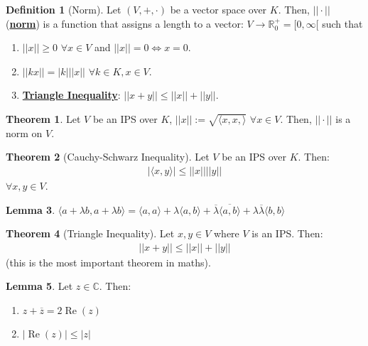 \documentclass[11pt]{scrartcl}
\newcommand{\R}[0]{\mathbb{R}}
\theoremstyle{definition}
\newtheorem{theorem}{Theorem}
\newtheorem{lemma}[theorem]{Lemma}
\newtheorem{definition}{Definition}
\theoremstyle{remark}
\newcommand{\dfn}[1]{\textbf{\underline{#1}}}
\newcommand{\C}[0]{\mathbb{C}}
\newcommand{\vsok}[0]{Let $(V, +, \cdot)$ be a vector space over $K$}
\begin{document}
\begin{definition}[Norm]
	\vsok. Then, $|| \cdot ||$ (\dfn{norm}) is a function that assigns a length to a vector: $V \rightarrow \R_0^+ = [0, \infty[$ such that
	\begin{enumerate}[noitemsep]
		\item $|| x|| \geq 0$ $\forall x \in V$ and $|| x || = 0 \iff x =0$. 
		\item $|| kx || = |k| || x ||  $ $\forall k \in K, x \in V$. 
		\item \dfn{Triangle Inequality}: $|| x +y || \leq || x || + ||y ||$. 
	\end{enumerate}
\end{definition}

\begin{theorem}
	Let $V$ be an IPS over $K$, $|| x || := \sqrt{ \langle x, x, \rangle }$ $\forall x \in V$. Then, $|| \cdot ||$ is a norm on $V$. 
\end{theorem}

\begin{theorem}[Cauchy-Schwarz Inequality]
	Let $V$ be an IPS over $K$. Then: 
	\begin{align}
		| \langle x, y \rangle | \leq || x|| || y || 	
	\end{align}
	$\forall x, y \in V$. 
\end{theorem}

\begin{lemma}
	$\langle a + \lambda b, a + \lambda b \rangle = \langle a, a \rangle + \lambda \langle a, b \rangle + \overline{\lambda} \overline{ \langle a, b \rangle } + \lambda \overline{\lambda} \langle b, b \rangle $
\end{lemma}


\begin{theorem}[Triangle Inequality]
	Let $x, y \in V$ where $V$ is an IPS. Then: 
	\begin{align}
		|| x + y || \leq || x|| + ||y||	
	\end{align}
	(this is the most important theorem in maths). 
\end{theorem}

\begin{lemma}
	Let $z \in \C$. Then: 
	\begin{enumerate}[noitemsep]
		\item $z + \overline{z} = 2 \operatorname{Re}(z)$
		\item $| \operatorname{Re}(z) | \leq |z|$
	\end{enumerate}
\end{lemma}
\end{document}

